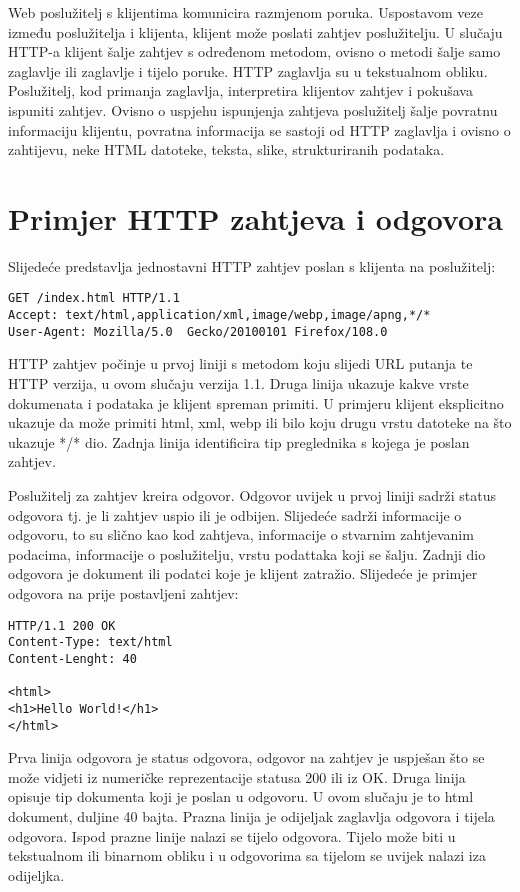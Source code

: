 \documentclass[]{foi} %
\begin{document}
Web poslužitelj s klijentima komunicira razmjenom poruka. Uspostavom veze između poslužitelja i klijenta,
klijent može poslati zahtjev poslužitelju. U slučaju HTTP-a klijent šalje zahtjev s određenom metodom,
ovisno o metodi šalje samo zaglavlje ili zaglavlje i tijelo poruke. HTTP zaglavlja su u tekstualnom obliku.
Poslužitelj, kod primanja zaglavlja, interpretira klijentov zahtjev i pokušava ispuniti zahtjev. Ovisno o
uspjehu ispunjenja zahtjeva poslužitelj šalje povratnu informaciju klijentu, povratna informacija se sastoji
od HTTP zaglavlja i ovisno o zahtijevu, neke HTML datoteke, teksta, slike, strukturiranih podataka.

\section{Primjer HTTP zahtjeva i odgovora}

Slijedeće predstavlja jednostavni HTTP zahtjev poslan s klijenta na poslužitelj:
\begin{verbatim}
GET /index.html HTTP/1.1
Accept: text/html,application/xml,image/webp,image/apng,*/*
User-Agent: Mozilla/5.0  Gecko/20100101 Firefox/108.0
\end{verbatim}

HTTP zahtjev počinje u prvoj liniji s metodom koju slijedi URL putanja te HTTP verzija, u ovom slučaju verzija 1.1.
Druga linija ukazuje kakve vrste dokumenata i podataka je klijent spreman primiti. U primjeru klijent eksplicitno ukazuje da
može primiti html, xml, webp ili bilo koju drugu vrstu datoteke na što ukazuje */* dio.
Zadnja linija identificira tip preglednika s kojega je poslan zahtjev.

Poslužitelj za zahtjev kreira odgovor. Odgovor uvijek u prvoj liniji sadrži status odgovora tj.
je li zahtjev uspio ili je odbijen. Slijedeće sadrži informacije o odgovoru, to su slično kao
kod zahtjeva, informacije o stvarnim zahtjevanim podacima, informacije o poslužitelju,
vrstu podattaka koji se šalju. Zadnji dio odgovora je dokument ili podatci koje je klijent
zatražio. Slijedeće je primjer odgovora na prije postavljeni zahtjev:
\begin{verbatim}
HTTP/1.1 200 OK
Content-Type: text/html
Content-Lenght: 40

<html>
<h1>Hello World!</h1>
</html>
\end{verbatim}
Prva linija odgovora je status odgovora, odgovor na zahtjev je uspješan što se može vidjeti iz
numeričke reprezentacije statusa 200 ili iz OK. Druga linija opisuje tip dokumenta koji je poslan
u odgovoru. U ovom slučaju je to html dokument, duljine 40 bajta. Prazna linija je odijeljak
zaglavlja odgovora i tijela odgovora. Ispod prazne linije nalazi se tijelo odgovora. Tijelo može
biti u tekstualnom ili binarnom obliku i u odgovorima sa tijelom se uvijek nalazi iza odijeljka.
\end{document}
